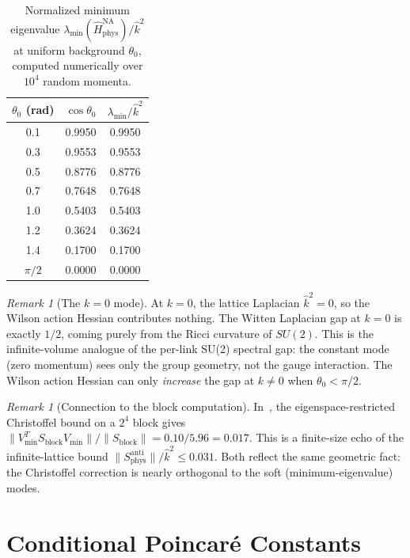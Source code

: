 \documentclass[11pt,a4paper]{article}
\theoremstyle{plain}
\theoremstyle{definition}
\theoremstyle{remark}
\newtheorem{remark}[theorem]{Remark}
\newcommand{\khat}{\hat{k}}
\begin{document}
\begin{table}[h]
\centering
\caption{Normalized minimum eigenvalue
$\lambda_{\min}(\hat{H}^{\mathrm{NA}}_{\mathrm{phys}})/\khat^2$
at uniform background $\theta_0$, computed numerically over
$10^4$ random momenta.}
\label{tab:theta-scan}
\begin{tabular}{@{}ccc@{}}
\toprule
$\theta_0$ (rad) & $\cos\theta_0$ &
  $\lambda_{\min}/\khat^2$ \\
\midrule
0.1 & 0.9950 & 0.9950 \\
0.3 & 0.9553 & 0.9553 \\
0.5 & 0.8776 & 0.8776 \\
0.7 & 0.7648 & 0.7648 \\
1.0 & 0.5403 & 0.5403 \\
1.2 & 0.3624 & 0.3624 \\
1.4 & 0.1700 & 0.1700 \\
$\pi/2$ & 0.0000 & 0.0000 \\
\bottomrule
\end{tabular}
\end{table}

\begin{remark}[The $k = 0$ mode]\label{rem:k0}
At $k = 0$, the lattice Laplacian $\khat^2 = 0$, so the
Wilson action Hessian contributes nothing.
The Witten Laplacian gap at $k = 0$ is exactly $1/2$,
coming purely from the Ricci curvature of $SU(2)$.
This is the infinite-volume analogue of the per-link
SU(2) spectral gap: the constant mode (zero momentum) sees
only the group geometry, not the gauge interaction.
The Wilson action Hessian can only \emph{increase} the gap
at $k \neq 0$ when $\theta_0 < \pi/2$.
\end{remark}

\begin{remark}[Connection to the block computation]
\label{rem:block}
In~\cite{Fontes2026}, the eigenspace-restricted Christoffel
bound on a $2^4$ block gives
$\|V_{\min}^T S_{\mathrm{block}} V_{\min}\|/\|S_{\mathrm{block}}\|
= 0.10/5.96 = 0.017$.
This is a finite-size echo of the infinite-lattice bound
$\|S^{\mathrm{anti}}_{\mathrm{phys}}\|/\khat^2 \leq 0.031$.
Both reflect the same geometric fact: the Christoffel correction
is nearly orthogonal to the soft (minimum-eigenvalue) modes.
\end{remark}


\section{Conditional Poincar\'e Constants}\label{sec:conditional}
\end{document}
